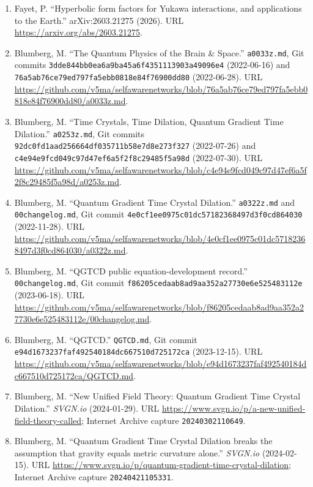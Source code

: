 \documentclass[
  american,
  11pt,
  letterpaper,
]{article}
\begin{document}
\begin{enumerate}
  Karam, A., Sánchez López, S., and Terente Díaz, J. J. ``Post-Newtonian Constraints on Scalar-Tensor Gravity.'' \emph{Physical Review D} 114, 023528 (2026). DOI \texttt{10.1103/j4w3-581d}.
\item
  Fayet, P. ``Hyperbolic form factors for Yukawa interactions, and applications to the Earth.'' arXiv:2603.21275 (2026). URL \url{https://arxiv.org/abs/2603.21275}.
\item
  Blumberg, M. ``The Quantum Physics of the Brain \& Space.'' \texttt{a0033z.md}, Git commits \nolinkurl{3dde844bb0ea6a9ba45a6f4351113903a49096e4} (2022-06-16) and \nolinkurl{76a5ab76ce79ed797fa5ebb0818e84f76900dd80} (2022-06-28). URL \url{https://github.com/v5ma/selfawarenetworks/blob/76a5ab76ce79ed797fa5ebb0818e84f76900dd80/a0033z.md}.
\item
  Blumberg, M. ``Time Crystals, Time Dilation, Quantum Gradient Time Dilation.'' \texttt{a0253z.md}, Git commits \nolinkurl{92dc0fd1aad256664df035711b58e7d8e273f327} (2022-07-26) and \nolinkurl{c4e94e9fcd049c97d47ef6a5f2f8c29485f5a98d} (2022-07-30). URL \url{https://github.com/v5ma/selfawarenetworks/blob/c4e94e9fcd049c97d47ef6a5f2f8c29485f5a98d/a0253z.md}.
\item
  Blumberg, M. ``Quantum Gradient Time Crystal Dilation.'' \texttt{a0322z.md} and \texttt{00changelog.md}, Git commit \nolinkurl{4e0cf1ee0975c01dc57182368497d3f0cd864030} (2022-11-28). URL \url{https://github.com/v5ma/selfawarenetworks/blob/4e0cf1ee0975c01dc57182368497d3f0cd864030/a0322z.md}.
\item
  Blumberg, M. ``QGTCD public equation-development record.'' \texttt{00changelog.md}, Git commit \nolinkurl{f86205cedaab8ad9aa352a27730e6e525483112e} (2023-06-18). URL \url{https://github.com/v5ma/selfawarenetworks/blob/f86205cedaab8ad9aa352a27730e6e525483112e/00changelog.md}.
\item
  Blumberg, M. ``QGTCD.'' \texttt{QGTCD.md}, Git commit \nolinkurl{e94d1673237faf492540184dc667510d725172ca} (2023-12-15). URL \url{https://github.com/v5ma/selfawarenetworks/blob/e94d1673237faf492540184dc667510d725172ca/QGTCD.md}.
\item
  Blumberg, M. ``New Unified Field Theory: Quantum Gradient Time Crystal Dilation.'' \emph{SVGN.io} (2024-01-29). URL \url{https://www.svgn.io/p/a-new-unified-field-theory-called}; Internet Archive capture \texttt{20240302110649}.
\item
  Blumberg, M. ``Quantum Gradient Time Crystal Dilation breaks the assumption that gravity equals metric curvature alone.'' \emph{SVGN.io} (2024-02-15). URL \url{https://www.svgn.io/p/quantum-gradient-time-crystal-dilation}; Internet Archive capture \texttt{20240421105331}.

\end{enumerate}
\end{document}
